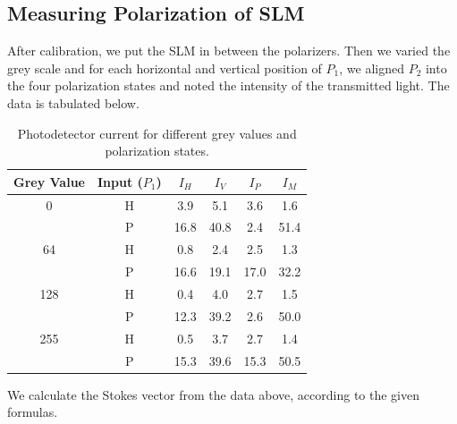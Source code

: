 \subsection{Measuring Polarization of SLM}
After calibration, we put the SLM in between the polarizers. Then we varied the grey scale and for each horizontal and vertical position of $P_1$, we aligned $P_2$ into the four polarization states and noted the intensity of the transmitted light. The data is tabulated below.
\begin{table}[H]
\centering
\begin{tabular}{c c c c c c}
\toprule
Grey Value & Input ($P_1$) & $I_H$ & $I_V$ & $I_P$ & $I_M$ \\
\midrule

0   & H & 3.9 & 5.1 & 3.6 & 1.6 \\
    & P & 16.8 & 40.8 & 2.4 & 51.4 \\

\midrule

64  & H & 0.8 & 2.4 & 2.5 & 1.3 \\
    & P & 16.6 & 19.1 & 17.0 & 32.2 \\

\midrule

128 & H & 0.4 & 4.0 & 2.7 & 1.5 \\
    & P & 12.3 & 39.2 & 2.6 & 50.0 \\

\midrule

255 & H & 0.5 & 3.7 & 2.7 & 1.4 \\
    & P & 15.3 & 39.6 & 15.3 & 50.5 \\

\bottomrule
\end{tabular}
\caption{Photodetector current for different grey values and polarization states.}
\end{table}
We calculate the Stokes vector from the data above, according to the given formulas.
